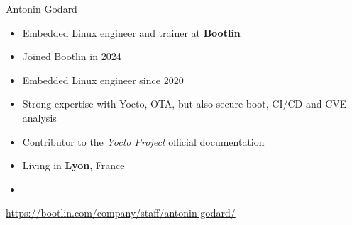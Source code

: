 \begin{frame}{Antonin Godard}
  \begin{itemize}
  \item Embedded Linux engineer and trainer at {\bf Bootlin}
  \item Joined Bootlin in 2024
  \item Embedded Linux engineer since 2020
  \item Strong expertise with Yocto, OTA, but also secure boot, CI/CD
    and CVE analysis
  \item Contributor to the {\em Yocto Project} official documentation
  \item Living in {\bf Lyon}, France
  \item {}
  \end{itemize}
  {\small \url{https://bootlin.com/company/staff/antonin-godard/}}
\end{frame}
